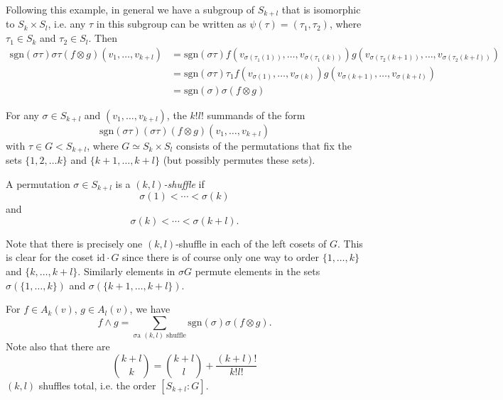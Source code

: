 \begin{xmpl}
\begin{enumerate}
{      Following this example, in general we have a subgroup of
      $S_{k+l}$ that is isomorphic to $S_k \times S_l$, i.e.
      any $\tau$ in this subgroup can be written as
      $\psi(\tau) = (\tau_1, \tau_2)$, where $\tau_1 \in S_k$ and
      $\tau_2 \in S_l$. Then
      \begin{align*}
         \mathrm{sgn}(\sigma \tau)
         \sigma \tau (f \otimes g)
         (v_1, \dots, v_{k +l})
      &= \mathrm{sgn}(\sigma \tau)
         f(v_{\sigma(\tau_1(1))}, \dots, v_{\sigma(\tau_1(k))})
         g(v_{\sigma(\tau_2(k+1))}, \dots, v_{\sigma(\tau_2(k+l))}) \\
      &= \mathrm{sgn}(\sigma \tau)
         \tau_1
           f(v_{\sigma(1)}, \dots, v_{\sigma(k)})
           g(v_{\sigma(k+1)}, \dots, v_{\sigma(k+l)}) \\
      &= \mathrm{sgn}(\sigma)
          \sigma (f \otimes g)
      \end{align*}
    }
  \end{enumerate}

  For any $\sigma \in S_{k + l}$ and $(v_1, \dots, v_{k+l})$, the
  $k!l!$ summands of the form
  $$
  \mathrm{sgn}(\sigma \tau)
  (\sigma \tau)(f \otimes g)(v_1, \dots, v_{k+l})
  $$
  with $\tau \in G < S_{k + l}$, where
  $G \simeq S_k \times S_l$ consists of the permutations that fix
  the sets $\{1, 2, \dots k\}$ and $\{ k + 1, \dots, k + l \}$ (but
  possibly permutes these sets).
\end{xmpl}

\begin{defn}
A permutation $\sigma \in S_{k+l}$ is a \emph{$(k, l)$-shuffle} if
$$
\sigma(1) < \cdots < \sigma(k)
$$
and
$$
\sigma(k) < \cdots < \sigma(k + l).
$$
\end{defn}
Note that there is precisely one $(k, l)$-shuffle in each of the left
cosets of $G$. This is clear for the coset
$\mathrm{id} \cdot G$ since there is of course only one way to order
$\{ 1, \dots, k \}$ and $\{ k, \dots, k + l \}$. Similarly elements in
$\sigma G$ permute elements in the sets $\sigma(\{ 1, \dots, k \})$
and $\sigma( \{ k + 1, \dots, k + l \})$.

\begin{prop}
For $f \in A_k(v)$, $g \in A_l(v)$, we have
$$
  f \wedge g
= \sum_{\sigma \text{a $(k, l)$ shuffle}}
    \mathrm{sgn}(\sigma)
    \sigma(f \otimes g).
$$
Note also that there are
$$
  { k + l \choose k }
= { k + l \choose l }
+ \frac{(k + l)!}{k! l!}
$$
$(k, l)$ shuffles total, i.e. the order $[S_{k + l} : G]$.
\end{prop}

